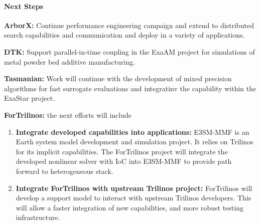 
\paragraph{Next Steps}

\indent

{\bf ArborX:} Continue performance engineering campaign and extend to
distributed search capabilities and communication and deploy in a variety of
applications.

{\bf DTK:} Support parallel-in-time coupling in the ExaAM project for
simulations of metal powder bed additive manufacturing.

{\bf Tasmanian:} Work will continue with the development of mixed precision
algorithms for fast surrogate evaluations and integratinv the capability within
the ExaStar project.

{\bf ForTrilinos:} the next efforts will include
\begin{enumerate}
  \item \textbf{Integrate developed capabilities into applications:} E3SM-MMF
    is an Earth system model development and simulation project. It relies on
    Trilinos for its implicit capabilities. The ForTrilinos project will
    integrate the developed nonlinear solver with IoC into E3SM-MMF to provide
    path forward to heterogeneous stack.
  \item \textbf{Integrate ForTrilinos with upstream Trilinos project:}
    ForTrilinos will develop a support model to interact with upstream Trilinos
    developers. This will allow a faster integration of new capabilities, and
    more robust testing infrastructure.
\end{enumerate}

